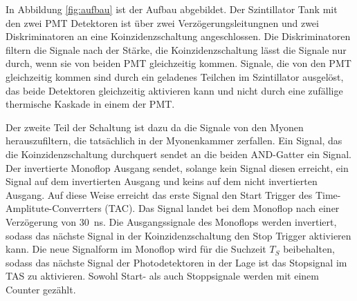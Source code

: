 In Abbildung \ref{fig:aufbau} ist der Aufbau abgebildet.
Der Szintillator Tank mit den zwei PMT Detektoren ist über zwei Verzögerungsleitungnen
und zwei Diskriminatoren an eine Koinzidenzschaltung angeschlossen. 
Die Diskriminatoren filtern die Signale nach der Stärke, die Koinzidenzschaltung
lässt die Signale nur durch, wenn sie von beiden PMT gleichzeitig kommen.
Signale, die von den PMT gleichzeitig kommen sind durch ein geladenes Teilchen im Szintillator
ausgelöst, das beide Detektoren gleichzeitig aktivieren kann und nicht durch eine zufällige 
thermische Kaskade in einem der PMT.

Der zweite Teil der Schaltung ist dazu da die Signale von den Myonen herauszufiltern, die tatsächlich
in der Myonenkammer zerfallen. Ein Signal, das die Koinzidenzschaltung durchquert
sendet an die beiden AND-Gatter ein Signal. Der invertierte Monoflop Ausgang sendet, solange kein
Signal diesen erreicht, ein Signal auf dem invertierten Ausgang und keins auf dem nicht invertierten Ausgang.
Auf diese Weise erreicht das erste Signal den Start Trigger des Time-Amplitute-Converrters (TAC).
Das Signal landet bei dem Monoflop nach einer Verzögerung von \qty{30}{\ns}. 
Die Ausgangssignale des Monoflops werden invertiert, sodass das nächste Signal in der 
Koinzidenzschaltung den Stop Trigger aktivieren kann.
Die neue Signalform im Monoflop wird für die Suchzeit $T_S$ beibehalten, sodass das nächste Signal der 
Photodetektoren in der Lage ist das Stopsignal im TAS zu aktivieren.
Sowohl Start- als auch Stoppsignale werden mit einem Counter gezählt. 


